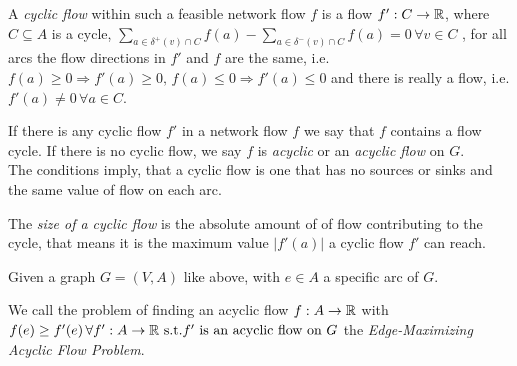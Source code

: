 \begin{definition}
A \textit{cyclic flow} within such a feasible network flow $f$ is a flow $f':C\to \mathbb{R}$, where $C\subseteq A$ is a cycle, 
$\sum_{a\in \delta^+(v)\cap C}f(a)-\sum_{a\in\delta^-(v)\cap C}f(a) = 0 \, \forall v\in C$ , for all arcs the flow 
directions in $f'$ and $f$ are the same, i.e. $f(a)\ge 0\Rightarrow f'(a)\ge 0,\, f(a)\le 0 \Rightarrow f'(a)\le 0$ and 
there is really a flow, i.e. $f'(a) \ne 0 \,\forall a\in C$. 

If there is any cyclic flow $f'$ in a network flow $f$ we say that $f$ contains a flow cycle. If there is no cyclic 
flow, we say $f$ is \textit{acyclic} or an \textit{acyclic flow} on $G$.\\

The conditions imply, that a cyclic flow is one that has no sources or sinks and the same value of flow on each arc.

The \textit{size of a cyclic flow} is the absolute amount of of flow contributing to the cycle, that means it is the 
maximum value $|f'(a)|$ a cyclic flow $f'$ can reach. 
\end{definition}


\begin{definition}
  Given a graph $G=(V,A)$ like above, with $e \in A$ a specific arc of $G$. 
  
  We call the problem of finding an acyclic flow $f:A\to \mathbb{R}$ with $f(e)\ge f'(e)\,\forall f':A\to \mathbb{R} \textrm{ s.t.} f' 
\textrm{ is an acyclic flow on }G$ the \textit{ Edge-Maximizing Acyclic Flow Problem}.
\end{definition}

